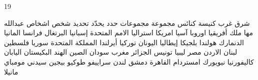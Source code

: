 \documentclass[twocolumn,a4paper]{article}
\begin{document}
19

\textarabic{ شرق  
 غرب  
 كنيسة  كنائس  
 مجموعة  مجموعات
 حدد  يحدّد  
 تحديد  
 شخص  اشخاص  
}\clearpage
\textarabic{
 عبدالله  
 مها  
 ملك  
}\clearpage
\textarabic{
 أفريقيا  
 اوروبا  
 آسيا  
 امريكا  
 استراليا  
 اﻻمم المتحدة  
 إسبانيا  
 البرتغال  
 فرانسا  
 المانيا  
  الدنمارك 
 هولندا  
 بلجيكا  
 إيطاليا  
 اليونان  
 توركيا  
 أيرلندا  
 المملكة المتحدة 
 سوريا  
 فلسطين  
 لبنان  
 الاردن  
 مصر  
 ليبيا  
 تونيس  
 الجزائر  
 مغرب  
 سودان  
 الصين  
 الهند  
 البكيستان  
 اليابان  
 كاليفورنيا  
 نيويورك  
 امستردام  
 القاهرة  
 دمشق  
 لندن  
 سراييفو  
 طوكيو  
 بيجين  
 سيدني  
 مومباي  
 مانيلا  
}
\end{document}
